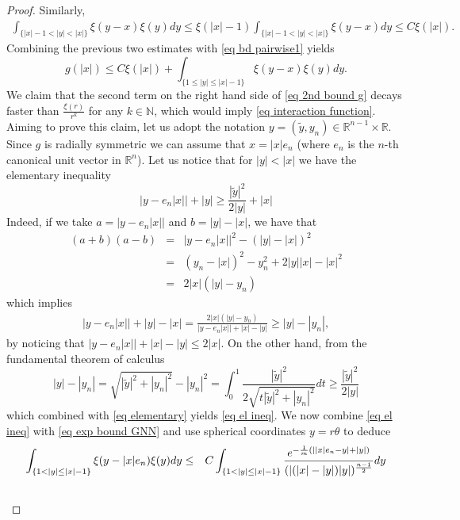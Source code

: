 \documentclass[11pt,letterpaper,reqno]{amsart}
\newcommand{\N}{\mathbb{N}}
\newcommand{\R}{\mathbb{R}}
\theoremstyle{plain}%
\theoremstyle{definition}
\numberwithin{equation}{section}
\numberwithin{figure}{section}
\begin{document}
\begin{proof}
	Similarly,
		\begin{eqnarray*}
		\int_{\{ |x|-1< |y|<|x|\}} \xi(y-x) \xi(y)dy\leq \xi(|x|-1)\int_{\{ |x|-1< |y|<|x|\}} \xi(y-x)dy\leq C \xi(|x|).
	\end{eqnarray*}	 
	Combining the previous two estimates with \eqref{eq bd pairwise1} yields 
	\begin{equation}\label{eq 2nd bound g}
		g(|x|)\leq C\xi(|x|)+ \int_{\{1\leq |y| \leq |x|-1\}} \xi(y-x) \xi(y)dy.
	\end{equation}	
We claim that the second term on the right hand side of \eqref{eq 2nd bound g} decays faster than $\frac{\xi(r)}{r^k}$ for any $k\in \N$, which would imply \eqref{eq interaction function}. Aiming to prove this claim, let us adopt the notation $y=(\tilde y, y_n) \in \R^{n-1}\times \R$. Since $g$ is radially symmetric we can assume that $x=|x|e_n$ (where $e_n$ is the $n$-th canonical unit vector in $\R^n$). Let us notice that for $|y|< |x|$ we have the elementary inequality 
	\begin{equation}\label{eq el ineq}
	|y-e_n |x||+|y| \geq \frac{|\tilde y|^2}{2|y|}+|x|
\end{equation}
	Indeed, if we take $a = |y-e_n |x||$ and $b=|y|-|x|$, we have that 
	\begin{eqnarray*}
		(a+b)(a-b)&=& |y-e_n|x||^2- (|y|-|x|)^2\\
		&=& (y_n-|x|)^2-y_n^2+2|y||x|-|x|^2\\		
		&=&2|x|(|y|-y_n)
	\end{eqnarray*} 
	which implies
		\begin{eqnarray}\label{eq elementary}
		|y-e_n |x||+|y|-|x| = \frac{2|x|(|y|-y_n)}{|y-e_n |x||+|x|-|y|} \geq |y|-|y_n|,
	\end{eqnarray} 
    by noticing that $|y-e_n |x||+|x|-|y|\leq 2|x|$. On the other hand, from the fundamental theorem of calculus
	\begin{equation*}
		|y|-|y_n| = \sqrt{|\tilde y|^2+|y_n|^2}-|y_n|^2 = \int_0^1 \frac{|\tilde y|^2}{2\sqrt{t|\tilde y|^2+|y_n|^2}}dt \geq \frac{|\tilde y|^2}{2 |y|}
	\end{equation*}	
	which combined with \eqref{eq elementary} yields \eqref{eq el ineq}. We now combine \eqref{eq el ineq} with \eqref{eq exp bound GNN} and use spherical coordinates $y=r\theta$ to deduce
	\begin{eqnarray}\notag
		\int_{\{1<|y| \leq |x|-1\}} \xi(y-|x|e_n) \xi(y)dy &\leq&  C\int_{\{1<|y| \leq |x|-1\}} \frac{e^{-\frac{1}{m}(||x|e_n-y|+|y|)}}{(|(|x|-|y|)|y|)^\frac{n-1}{2}} dy\\\notag

\end{eqnarray}
\end{proof}
\end{document}

